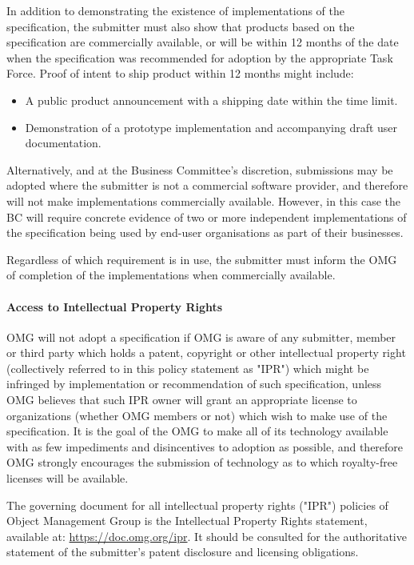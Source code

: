 In addition to demonstrating the existence of implementations of the specification, the submitter must also show that products based on the specification are commercially available, or will be within 12 months of the date when the specification was recommended for adoption by the appropriate Task Force. Proof of intent to ship product within 12 months might include:

\begin{itemize}
\item 	A public product announcement with a shipping date within the time limit.
\item     Demonstration of a prototype implementation and accompanying draft user documentation.
\end{itemize}

Alternatively, and at the Business Committee's discretion, submissions may be adopted where the submitter is not a commercial software provider, and therefore will not make implementations commercially available. However, in this case the BC will require concrete evidence of two or more independent implementations of the specification being used by end-user organisations as part of their businesses.

Regardless of which requirement is in use, the submitter must inform the OMG of completion of the implementations when commercially available.


\paragraph{Access to Intellectual Property Rights}

OMG will not adopt a specification if OMG is aware of any submitter, member or third party which holds a patent, copyright or other intellectual property right (collectively referred to in this policy statement as "IPR") which might be infringed by implementation or recommendation of such specification, unless OMG believes that such IPR owner will grant an appropriate license to organizations (whether OMG members or not) which wish to make use of the specification. It is the goal of the OMG to make all of its technology available with as few impediments and disincentives to adoption as possible, and therefore OMG strongly encourages the submission of technology as to which royalty-free licenses will be available.

The governing document for all intellectual property rights ("IPR") policies of Object Management Group is the Intellectual Property Rights statement, available at: \url{https://doc.omg.org/ipr}. It should be consulted for the authoritative statement of the submitter's patent disclosure and licensing obligations.


